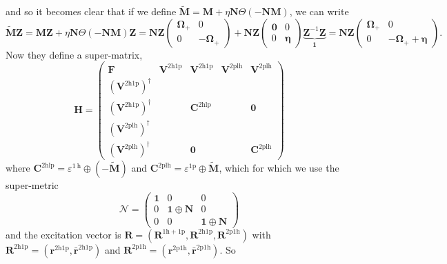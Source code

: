 and so it becomes clear that if we define $\tilde{\bm{M}} = \bm{M} + \eta \bm{N}\Theta(-\bm{N}\bm{M})$, we can write
\begin{equation}
    \tilde{\bm{M}} \bm{Z} = \bm{M} \bm{Z} + \eta \bm{N}\Theta(-\bm{N}\bm{M}) \bm{Z} = \mathbf{N}\bm{Z}\left(\begin{array}{cc}
\boldsymbol{\Omega}_{+} & 0 \\
0 & -\boldsymbol{\Omega}_{+}
\end{array}\right) + \bm{N}\bm{Z} \left(\begin{array}{cc}\bm{0} & 0 \\ 0 & \bm{\eta}\end{array}\right) \underbrace{\bm{Z}^{-1} \bm{Z}}_{ \bm{1}} = \bm{N}\bm{Z}\left(\begin{array}{cc}\boldsymbol{\Omega}_{+} & 0 \\ 0 & -\boldsymbol{\Omega}_{+} + \bm{\eta}\end{array}\right).
\end{equation}
Now they define a super-matrix,
\begin{equation}
\bm{H} =
\begin{pmatrix}
\bm{F} & \bm{V}^{2\mathrm{h1p}} & \bm{V}^{2\mathrm{h1p}} & \bm{V}^{2\mathrm{plh}} & \bm{V}^{2\mathrm{plh}} \\
\left(\bm{V}^{2\mathrm{h1p}}\right)^{\dagger} &  &  & & \\
\left(\bm{V}^{2\mathrm{h1p}}\right)^{\dagger} &  & \bm{C}^{2\mathrm{hlp}} & & \bm{0} \\
\left(\bm{V}^{2\mathrm{plh}}\right)^{\dagger} & & & & \\
\left(\bm{V}^{2\mathrm{plh}}\right)^{\dagger} &  & \bm{0} & & \bm{C}^{2\mathrm{plh}}
\end{pmatrix}
\end{equation}
where $\mathbf{C}^{2 \mathrm{hlp}}=\varepsilon^{1 \mathrm{~h}} \oplus(-\tilde{\mathbf{M}})$ and $\mathbf{C}^{2 \mathrm{plh}}=\varepsilon^{1 \mathrm{p}} \oplus \tilde{\mathbf{M}}$, which for which we use the super-metric
$$
\bm{\mathcal{N}}=\left(\begin{array}{ccc}
\bm{1} & 0 & 0 \\
0 & \bm{1} \oplus \bm{N} & 0 \\
0 & 0 & \bm{1} \oplus \bm{N}
\end{array}\right)
$$
and the excitation vector is $\bm{R} = (\bm{R}^{1\mathrm{h}+1\mathrm{p}}, \bm{R}^{2\mathrm{h}1\mathrm{p}}, \bm{R}^{2\mathrm{p}1\mathrm{h}})$ with $\bm{R}^{2\mathrm{h}1\mathrm{p}}=(\bm{r}^{2\mathrm{h}1\mathrm{p}}, \bm{\bar{r}}^{2\mathrm{h}1\mathrm{p}})$ and $\bm{R}^{2\mathrm{p}1\mathrm{h}}=(\bm{r}^{2\mathrm{p}1\mathrm{h}}, \bm{\bar{r}}^{2\mathrm{p}1\mathrm{h}})$. So 
